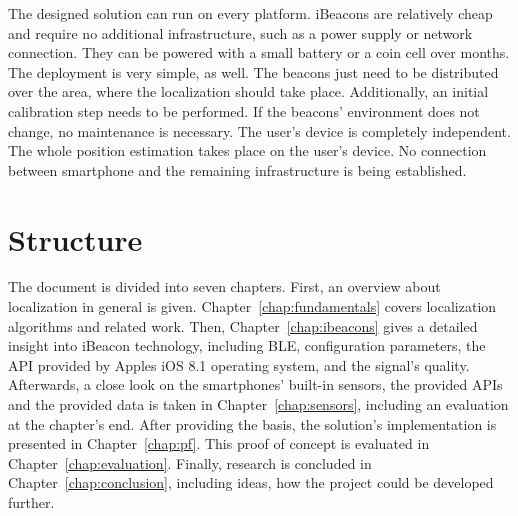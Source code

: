 The designed solution can run on every platform. iBeacons are relatively cheap and require no additional infrastructure, such as a power supply or network connection. They can be powered with a small battery or a coin cell over months. The deployment is very simple, as well. The beacons just need to be distributed over the area, where the localization should take place. Additionally, an initial calibration step needs to be performed. If the beacons' environment does not change, no maintenance is necessary. The user's device is completely independent. The whole position estimation takes place on the user's device. No connection between smartphone and the remaining infrastructure is being established.


\section{Structure}
The document is divided into seven chapters. First, an overview about localization in general is given. Chapter~\ref{chap:fundamentals} covers localization algorithms and related work. Then, Chapter~\ref{chap:ibeacons} gives a detailed insight into iBeacon technology, including \acl{BLE}, configuration parameters, the \ac{API} provided by Apples iOS 8.1 operating system, and the signal's quality. Afterwards, a close look on the smartphones' built-in sensors, the provided \acsp{API} and the provided data is taken in Chapter~\ref{chap:sensors}, including an evaluation at the chapter's end. After providing the basis, the solution's implementation is presented in Chapter~\ref{chap:pf}. This proof of concept is evaluated in Chapter~\ref{chap:evaluation}. Finally, research is concluded in Chapter~\ref{chap:conclusion}, including ideas, how the project could be developed further.
